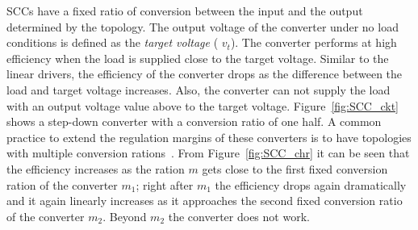 SCCs have a fixed ratio of conversion between the input and the output determined by the topology. The output voltage of the converter under no load conditions is defined as the \emph{target voltage} ( $v_t$). The converter performs at high efficiency when the load is supplied close to the target voltage. Similar to the linear drivers, the efficiency of the converter drops as the difference between the load and target voltage increases. Also, the converter can not supply the load with an output voltage value above to the target voltage. Figure~\ref{fig:SCC_ckt} shows a step-down converter with a conversion ratio of one half. A common practice to extend the regulation margins of these converters is to have topologies with multiple conversion rations~\cite{2013Ma,2013Breussegem:m_trg}. From Figure~\ref{fig:SCC_chr} it can be seen that the efficiency increases as the ration $m$ gets close to the first fixed conversion ration of the converter $m_1$; right after $m_1$ the efficiency drops again dramatically and it again linearly increases as it approaches the second fixed conversion ratio of the converter $m_2$. Beyond $m_2$ the converter does not work.
